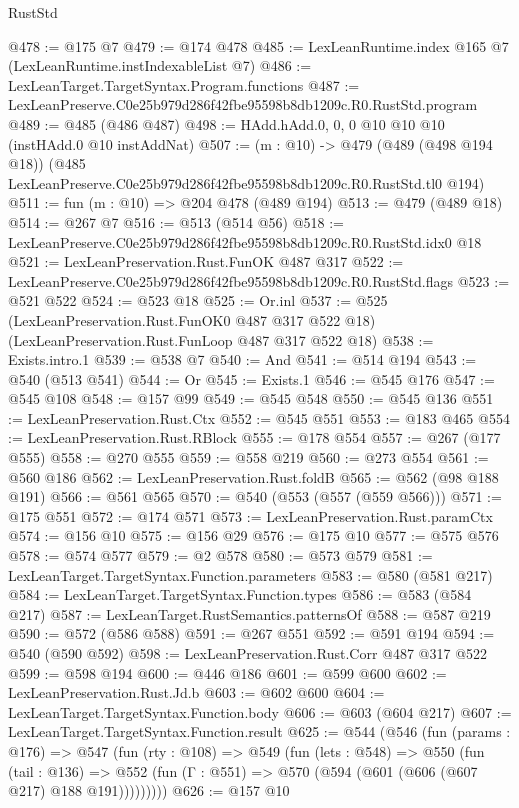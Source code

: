\begin{lexlean}{RustStd}
\begin{coremodule}
@478 := @175 @7
@479 := @174 @478
@485 := LexLeanRuntime.index @165 @7 (LexLeanRuntime.instIndexableList @7)
@486 := LexLeanTarget.TargetSyntax.Program.functions
@487 := LexLeanPreserve.C0e25b979d286f42fbe95598b8db1209c.R0.RustStd.program
@489 := @485 (@486 @487)
@498 := HAdd.hAdd.{0, 0, 0} @10 @10 @10 (instHAdd.{0} @10 instAddNat)
@507 := (m : @10) ->
  @479
    (@489 (@498 @194 @18))
    (@485 LexLeanPreserve.C0e25b979d286f42fbe95598b8db1209c.R0.RustStd.tl0 @194)
@511 := fun (m : @10) => @204 @478 (@489 @194)
@513 := @479 (@489 @18)
@514 := @267 @7
@516 := @513 (@514 @56)
@518 := LexLeanPreserve.C0e25b979d286f42fbe95598b8db1209c.R0.RustStd.idx0 @18
@521 := LexLeanPreservation.Rust.FunOK @487 @317
@522 := LexLeanPreserve.C0e25b979d286f42fbe95598b8db1209c.R0.RustStd.flags
@523 := @521 @522
@524 := @523 @18
@525 := Or.inl
@537 := @525
    (LexLeanPreservation.Rust.FunOK0 @487 @317 @522 @18)
    (LexLeanPreservation.Rust.FunLoop @487 @317 @522 @18)
@538 := Exists.intro.{1}
@539 := @538 @7
@540 := And
@541 := @514 @194
@543 := @540 (@513 @541)
@544 := Or
@545 := Exists.{1}
@546 := @545 @176
@547 := @545 @108
@548 := @157 @99
@549 := @545 @548
@550 := @545 @136
@551 := LexLeanPreservation.Rust.Ctx
@552 := @545 @551
@553 := @183 @465
@554 := LexLeanPreservation.Rust.RBlock
@555 := @178 @554
@557 := @267 (@177 @555)
@558 := @270 @555
@559 := @558 @219
@560 := @273 @554
@561 := @560 @186
@562 := LexLeanPreservation.Rust.foldB
@565 := @562 (@98 @188 @191)
@566 := @561 @565
@570 := @540 (@553 (@557 (@559 @566)))
@571 := @175 @551
@572 := @174 @571
@573 := LexLeanPreservation.Rust.paramCtx
@574 := @156 @10
@575 := @156 @29
@576 := @175 @10
@577 := @575 @576
@578 := @574 @577
@579 := @2 @578
@580 := @573 @579
@581 := LexLeanTarget.TargetSyntax.Function.parameters
@583 := @580 (@581 @217)
@584 := LexLeanTarget.TargetSyntax.Function.types
@586 := @583 (@584 @217)
@587 := LexLeanTarget.RustSemantics.patternsOf
@588 := @587 @219
@590 := @572 (@586 @588)
@591 := @267 @551
@592 := @591 @194
@594 := @540 (@590 @592)
@598 := LexLeanPreservation.Rust.Corr @487 @317 @522
@599 := @598 @194
@600 := @446 @186
@601 := @599 @600
@602 := LexLeanPreservation.Rust.Jd.b
@603 := @602 @600
@604 := LexLeanTarget.TargetSyntax.Function.body
@606 := @603 (@604 @217)
@607 := LexLeanTarget.TargetSyntax.Function.result
@625 := @544
    (@546
      (fun (params : @176) =>
      @547
        (fun (rty : @108) =>
        @549
          (fun (lets : @548) =>
          @550
            (fun (tail : @136) =>
            @552 (fun (Γ : @551) => @570 (@594 (@601 (@606 (@607 @217) @188 @191)))))))))
@626 := @157 @10

\end{coremodule}
\end{lexlean}
